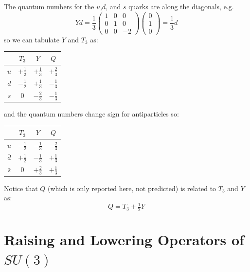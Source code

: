 \documentclass[12pt]{article}
\begin{document}
The quantum numbers for the $u$,$d$, and $s$ quarks are along the diagonals, e.g.
$$Y d = \frac{1}{3}\begin{pmatrix} 1 & 0 & 0 \\ 0 & 1 & 0 \\ 0 & 0 & -2 \end{pmatrix}
\begin{pmatrix} 0 \\ 1 \\ 0  \end{pmatrix} = \frac{1}{3} d
$$
so we can tabulate $Y$ and $T_3$ as:
\begin{center}
  \begin{tabular}{c|ccc}
  & $T_3$ & $Y$ & $Q$ \\
  \hline
  $u$ & $+\tfrac{1}{2}$ & $+\tfrac{1}{3}$ & $+\tfrac{2}{3}$ \\[4pt]
  $d$ & $-\tfrac{1}{2}$ & $+\tfrac{1}{3}$ & $-\tfrac{1}{3}$ \\[4pt]
  $s$ & $0$             & $-\tfrac{2}{3}$ & $-\tfrac{1}{3}$ \\
\end{tabular}
\end{center}
and the quantum numbers change sign for antiparticles so:
\begin{center}
  \begin{tabular}{c|ccc}
  & $T_3$ & $Y$ & $Q$ \\
  \hline
  $\bar{u}$ & $-\tfrac{1}{2}$ & $-\tfrac{1}{3}$ & $-\tfrac{2}{3}$ \\[4pt]
  $\bar{d}$ & $+\tfrac{1}{2}$ & $-\tfrac{1}{3}$ & $+\tfrac{1}{3}$ \\[4pt]
  $\bar{s}$ & $0$             & $+\tfrac{2}{3}$ & $+\tfrac{1}{3}$ \\
\end{tabular}
\end{center}
Notice that $Q$ (which is only reported here, not predicted) is related to $T_3$ and $Y$ as:
\begin{equation*}
  Q = T_3 + \tfrac{1}{2}Y
\end{equation*}


\section*{Raising and Lowering Operators of $SU(3)$}
\end{document}
